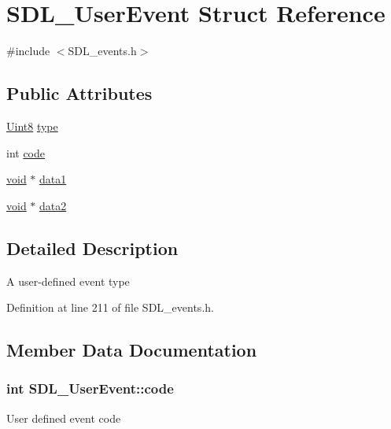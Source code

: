 \hypertarget{struct_s_d_l___user_event}{}\section{S\+D\+L\+\_\+\+User\+Event Struct Reference}
\label{struct_s_d_l___user_event}


{\ttfamily \#include $<$S\+D\+L\+\_\+events.\+h$>$}

\subsection*{Public Attributes}
\begin{DoxyCompactItemize}
\item 
\hyperlink{_s_d_l__stdinc_8h_a2944638813a090aa23e62f4da842c3e2}{Uint8} \hyperlink{struct_s_d_l___user_event_a4ad7c1f518eef5dfedc09c9bab1d1e42}{type}
\item 
int \hyperlink{struct_s_d_l___user_event_aed0990a34143309d42e9d0f20a7a9cd4}{code}
\item 
\hyperlink{_s_d_l__opengl_8h_a3db05964a3cc4410f35b7ea2b7eb850d}{void} $\ast$ \hyperlink{struct_s_d_l___user_event_ab2893a12be2f97195f16463a23107913}{data1}
\item 
\hyperlink{_s_d_l__opengl_8h_a3db05964a3cc4410f35b7ea2b7eb850d}{void} $\ast$ \hyperlink{struct_s_d_l___user_event_aae4dbf65c34d654c9edf519eb061b7cf}{data2}
\end{DoxyCompactItemize}


\subsection{Detailed Description}
A user-\/defined event type 

Definition at line 211 of file S\+D\+L\+\_\+events.\+h.



\subsection{Member Data Documentation}
\hypertarget{struct_s_d_l___user_event_aed0990a34143309d42e9d0f20a7a9cd4}{}
\subsubsection[{code}]{\setlength{\rightskip}{0pt plus 5cm}int S\+D\+L\+\_\+\+User\+Event\+::code}\label{struct_s_d_l___user_event_aed0990a34143309d42e9d0f20a7a9cd4}
User defined event code 

